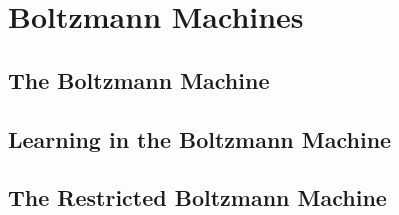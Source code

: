 \documentclass[11pt, oneside]{book}
\begin{document}
\chapter{Boltzmann Machines}

\section{The Boltzmann Machine}


\section{Learning in the Boltzmann Machine}


\section{The Restricted Boltzmann Machine}

\end{document}
